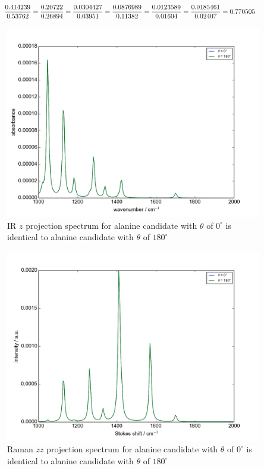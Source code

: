 \begin{eqnarray} 
\resizebox{0.9\linewidth}{!}{$
\begin{split}
\frac{0.414239}{0.53762} &= \frac{0.20722}{0.26894} = \frac{0.0304427}{0.03951}  =\frac{0.0876989}{0.11382} = \frac{0.0123589}{0.01604} = \frac{0.0185461}{0.02407} = 0.770505
\end{split}
$}\label{eqn:A.10}
\end{eqnarray}


\begin{figure}[!ht] 
\centering
\includegraphics[scale=0.7]{Figures/Ala_candidates_plotting_ir_z_2.png}
\caption{IR $z$ projection spectrum for alanine candidate with $\theta$ of $0^{\circ}$ is identical to alanine candidate with $\theta$ of $180^{\circ}$} \label{fig:A.1}
\end{figure}

\begin{figure}[!ht] 
\centering
\includegraphics[scale=0.7]{Figures/Ala_candidates_plotting_raman_zz_2.png}
\caption{Raman $zz$ projection spectrum for alanine candidate with $\theta$ of $0^{\circ}$ is identical to alanine candidate with $\theta$ of $180^{\circ}$} \label{fig:A.2}
\end{figure}

